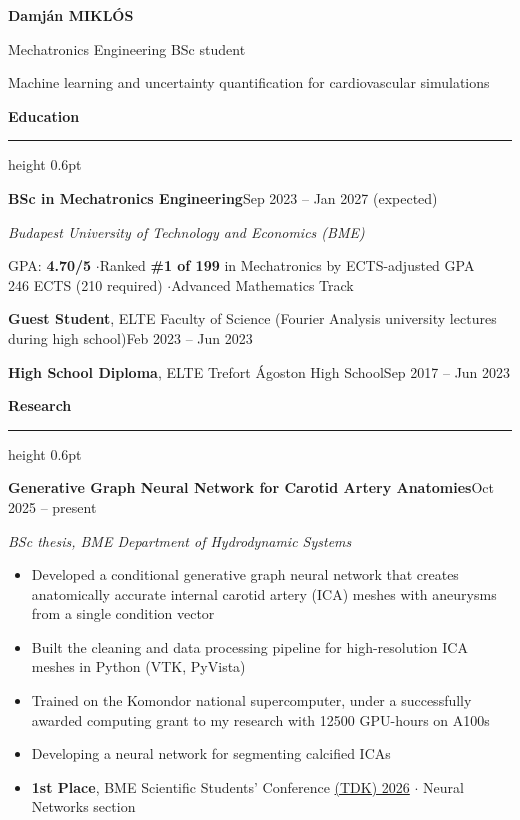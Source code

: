 \documentclass[10pt,a4paper]{article}
\newlength{\sidewidth}\setlength{\sidewidth}{0.27\textwidth}
\newlength{\colgap}\setlength{\colgap}{1.3em}
\newlength{\mainwidth}\setlength{\mainwidth}{\dimexpr\textwidth-\sidewidth-\colgap\relax}
\newcommand{\cvsection}[1]{%
    \vspace{0.25cm plus 1fill}%
    {\color{accent}\large\bfseries #1}\par\vspace{0.06cm}%
    {\color{accent}\hrule height 0.6pt}\vspace{0.16cm}%
}
\newcommand{\cventry}[4]{%
    {\bfseries #1}\hfill{\small\color{subtle}#2}\par
    {\itshape #3}\par
    \vspace{1pt}%
    #4%
    \par\vspace{0.12cm plus 0.5fill}%
}
\newcommand{\cvline}[2]{%
    #1\hfill{\small\color{subtle}#2}\par
}
\newenvironment{outcomes}{%
    \begin{itemize}[label={\color{accent}\small\faCaretRight}, leftmargin=1em, topsep=2pt]%
}{\end{itemize}}
\begin{document}
\begin{minipage}[t][\dimexpr\textheight-12pt\relax][s]{\mainwidth}\vspace{0pt}


{\Huge\bfseries Damján \textcolor{accent}{MIKLÓS}}\par
\vspace{0.15cm}
{\large Mechatronics Engineering BSc student}\par
\vspace{0.05cm}
{\color{subtle} Machine learning and uncertainty quantification for cardiovascular simulations}\par

\cvsection{Education}

\cventry{BSc in Mechatronics Engineering}{Sep 2023 -- Jan 2027 (expected)}
{Budapest University of Technology and Economics (BME)}
{GPA: \textbf{4.70/5} \quad$\cdot$\quad Ranked \textbf{\#1 of 199} in Mechatronics by ECTS-adjusted GPA \\
246 ECTS (210 required) \quad$\cdot$\quad Advanced Mathematics Track}

\cvline{\textbf{Guest Student}, ELTE Faculty of Science (Fourier Analysis university lectures during high school)}{Feb 2023 -- Jun 2023}
\vspace{0.06cm}
\cvline{\textbf{High School Diploma}, ELTE Trefort Ágoston High School}{Sep 2017 -- Jun 2023}


\cvsection{Research}


\cventry{Generative Graph Neural Network for Carotid Artery Anatomies}{Oct 2025 -- present}
{BSc thesis, BME Department of Hydrodynamic Systems}
{\begin{itemize}
    \item Developed a conditional generative graph neural network that creates anatomically accurate internal carotid artery (ICA) meshes with aneurysms from a single condition vector
    \item Built the cleaning and data processing pipeline for high-resolution ICA meshes in Python (VTK, PyVista)
    \item Trained on the Komondor national supercomputer, under a successfully awarded computing grant to my research with 12500 GPU-hours on A100s
    \item Developing a neural network for segmenting calcified ICAs
\end{itemize}
\begin{outcomes}
    \item \textbf{1st Place}, BME Scientific Students' Conference \href{https://tdk.bme.hu/ConferenceFiles/VIK/2026/Paper/CFDszimulaciora-alkalmas-intrakranialis-20261101-235056.pdf?paperId=18412}{(TDK) 2026}{\small\color{subtle} \;$\cdot$\; Neural Networks section}
\end{outcomes}}



\end{minipage}
\end{document}
